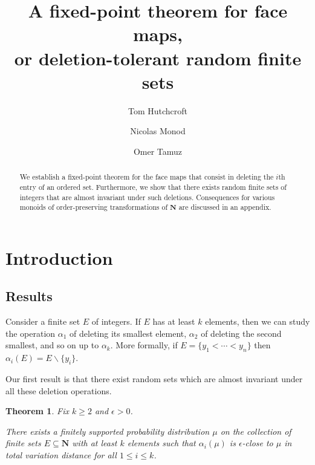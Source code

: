 \documentclass[12pt, pdflatex]{amsart}
\newtheorem{itheorem}{Theorem} %
\theoremstyle{definition}
\numberwithin{equation}{section}
\numberwithin{theorem}{section}
\newcommand{\NN}{\mathbf{N}}
\begin{document}
\title[Fixed points, faces and deleting entries]{A fixed-point theorem for face maps,\\ or deletion-tolerant  random finite sets}

\author[Hutchcroft]{Tom Hutchcroft}
\author[Monod]{Nicolas Monod}
\author[Tamuz]{Omer Tamuz}
\address{T.H., O.T.: Caltech, Pasadena, CA 91125, USA}
\address{N.M.: EPFL, 1015 Lausanne, Switzerland}




\begin{abstract}
We establish a fixed-point theorem for the face maps that consist in deleting the $i$th entry of an ordered set. Furthermore, we show that there exists random finite sets of integers that are almost invariant under such deletions. Consequences for various monoids of order-preserving transformations of $\NN$ are discussed in an appendix.
\end{abstract}

\maketitle
\section{Introduction}
%
\subsection*{Results}
Consider a finite set $E$ of integers. If $E$ has at least $k$ elements, then we can study the operation $\alpha_1$ of deleting its smallest element, $\alpha_2$ of deleting the second smallest, and so on up to $\alpha_k$. More formally, if $E=\{y_1 < \cdots < y_{n}\}$ then $\alpha_i (E) = E \smallsetminus \{y_i\}$.

Our first result is that there exist random sets which are almost invariant under all these deletion operations.

\begin{itheorem}\label{thm:random-sets}
Fix $k\geq 2$ and $\epsilon >0$.

There exists a finitely supported probability distribution $\mu$ on the collection of finite sets $E\subseteq \NN$ with at least $k$ elements such that $\alpha_i (\mu)$ is $\epsilon$-close to $\mu$ in total variation distance for all $1\leq i \leq k$.
\end{itheorem}
\end{document}

